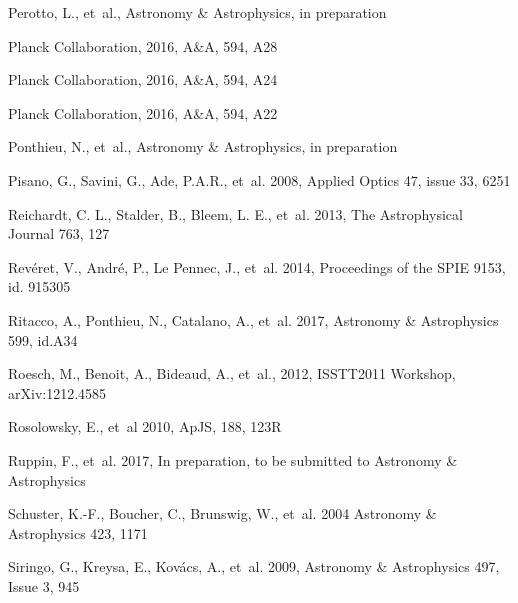 \begin{thebibliography}{99}
Perotto, L., {et~al.}, 
Astronomy \& Astrophysics, in preparation


Planck Collaboration, 2016, A\&A, 594, A28


Planck Collaboration, 2016, A\&A, 594, A24


Planck Collaboration, 2016, A\&A, 594, A22

Ponthieu, N., {et~al.}, 
Astronomy \& Astrophysics, in preparation

Pisano, G., Savini, G., Ade, P.A.R., {et~al.} 2008, 
Applied Optics 47, issue 33, 6251

Reichardt, C. L., Stalder, B., Bleem, L. E., {et~al.} 2013, 
The Astrophysical Journal 763, 127

Rev\'eret, V., Andr\'e, P., Le Pennec, J., {et~al.} 2014, 
Proceedings of the SPIE 9153, id. 915305

Ritacco, A., Ponthieu, N., Catalano, A., {et~al.} 2017, 
Astronomy \& Astrophysics 599, id.A34

Roesch, M., Benoit, A., Bideaud, A., {et~al.}, 2012, 
ISSTT2011 Workshop, arXiv:1212.4585

Rosolowsky, E., {et~al} 2010, ApJS, 188, 123R

Ruppin, F., {et~al.} 2017, 
In preparation, to be submitted to Astronomy \& Astrophysics

Schuster, K.-F., Boucher, C., Brunswig, W., {et~al.} 2004 
Astronomy \& Astrophysics 423, 1171

Siringo, G., Kreysa, E., Kov\'acs, A., {et~al.} 2009, 
Astronomy \& Astrophysics 497, Issue 3, 945


\end{thebibliography}
